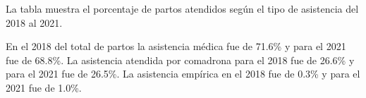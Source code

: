 La tabla muestra el porcentaje de partos atendidos según el tipo de asistencia del 2018 al 2021. 

En el 2018 del total de partos la asistencia médica fue de 71.6\% y para el 2021 fue de 68.8\%. La asistencia atendida por comadrona para el 2018 fue de 26.6\% y para el 2021 fue de 26.5\%. La asistencia empírica en el 2018 fue de 0.3\%  y para el 2021 fue de 1.0\%. 